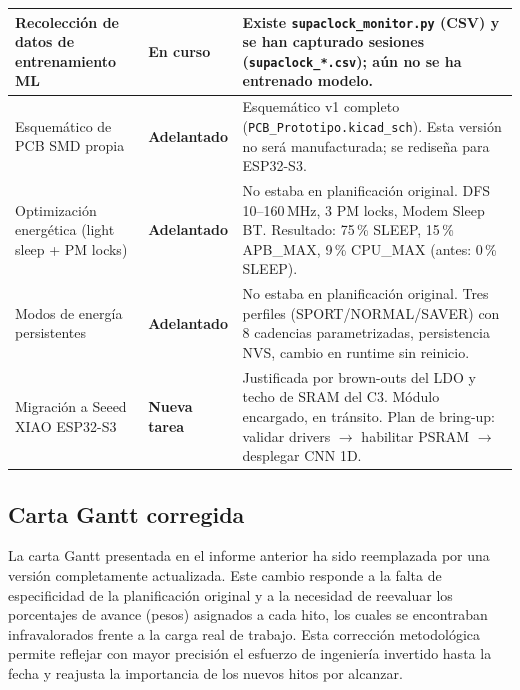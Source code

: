 \documentclass[letterpaper,11pt]{article}
\begin{document}
\begin{table}[H]
\begin{tabular}{|L{4.0cm}|L{2.4cm}|L{8.0cm}|}
     Recolección de datos de entrenamiento ML & \bf En curso & Existe \texttt{supaclock\_monitor.py} (CSV) y se han capturado sesiones (\texttt{supaclock\_*.csv}); aún no se ha entrenado modelo. \\\hline
     Esquemático de PCB SMD propia & \bf Adelantado & Esquemático v1 completo (\texttt{PCB\_Prototipo.kicad\_sch}). Esta versión no será manufacturada; se rediseña para ESP32-S3. \\\hline
     Optimización energética (light sleep + PM locks) & \bf Adelantado & No estaba en planificación original. DFS 10--160\,MHz, 3 PM locks, Modem Sleep BT. Resultado: 75\,\% SLEEP, 15\,\% APB\_MAX, 9\,\% CPU\_MAX (antes: 0\,\% SLEEP). \\\hline
     Modos de energía persistentes & \bf Adelantado & No estaba en planificación original. Tres perfiles (SPORT/NORMAL/SAVER) con 8 cadencias parametrizadas, persistencia NVS, cambio en runtime sin reinicio. \\\hline
     Migración a Seeed XIAO ESP32-S3 & \bf Nueva tarea & Justificada por brown-outs del LDO y techo de SRAM del C3. Módulo encargado, en tránsito. Plan de bring-up: validar drivers $\to$ habilitar PSRAM $\to$ desplegar CNN 1D. \\\hline
    \end{tabular}
\end{table}

\subsection{Carta Gantt corregida}
La carta Gantt presentada en el informe anterior ha sido reemplazada por una versión completamente actualizada. Este cambio responde a la falta de especificidad de la planificación original y a la necesidad de reevaluar los porcentajes de avance (pesos) asignados a cada hito, los cuales se encontraban infravalorados frente a la carga real de trabajo. Esta corrección metodológica permite reflejar con mayor precisión el esfuerzo de ingeniería invertido hasta la fecha y reajusta la importancia de los nuevos hitos por alcanzar.
\end{document}
